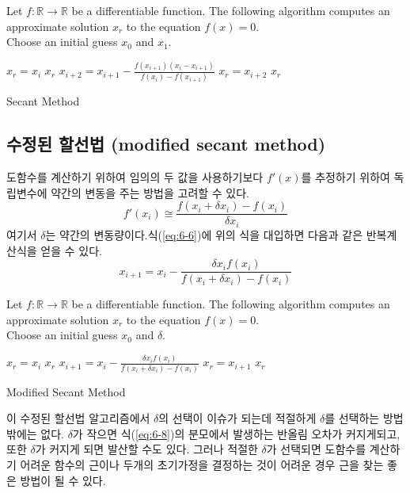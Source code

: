 \begin{algorithm}
Let $f:\mathbb{R}\rightarrow\mathbb{R}$ be a differentiable function. The following algorithm computes an approximate solution $x_{r}$ to the equation $f(x)=0$.\\
Choose an initial guess $x_{0}$ and $x_{1}$.
\begin{algorithmic}
    \State $x_{r}=x_{i}$
    \State \Return $x_{r}$
  \EndIf
  \State $x_{i+2}=x_{i+1}-\frac{f(x_{i+1})(x_{i}-x_{i+1})}{f(x_{i})-f(x_{i+1})}$
    \State $x_{r}=x_{i+2}$
    \State \Return $x_{r}$
  \EndIf
\EndFor
\end{algorithmic}
\caption{Secant Method}
\end{algorithm}

\clearpage
\subsection{수정된 할선법 (modified secant method)}
도함수를 계산하기 위하여 임의의 두 값을 사용하기보다 $f'(x)$를 추정하기 위하여 독립변수에 약간의 변동을 주는 방법을 고려할 수 있다.
\begin{equation}
f'(x_{i})\cong \frac{f(x_{i}+\delta x_{i})-f(x_{i})}{\delta x_{i}}
\end{equation}
여기서 $\delta$는 약간의 변동량이다.식(\ref{eq:6-6})에 위의 식을 대입하면 다음과 같은 반복계산식을 얻을 수 있다.
\begin{equation}\label{eq:6-8}
x_{i+1}=x_{i}-\frac{\delta x_{i}f(x_{i})}{f(x_{i}+\delta x_{i})-f(x_{i})}
\end{equation}

\begin{algorithm}
Let $f:\mathbb{R}\rightarrow\mathbb{R}$ be a differentiable function. The following algorithm computes an approximate solution $x_{r}$ to the equation $f(x)=0$.\\
Choose an initial guess $x_{0}$ and $\delta$.
\begin{algorithmic}
    \State $x_{r}=x_{i}$
    \State \Return $x_{r}$
  \EndIf
  \State $x_{i+1}=x_{i}-\frac{\delta x_{i}f(x_{i})}{f(x_{i}+\delta x_{i})-f(x_{i})}$
    \State $x_{r}=x_{i+1}$
    \State \Return $x_{r}$
  \EndIf
\EndFor
\end{algorithmic}
\caption{Modified Secant Method}
\end{algorithm}
이 수정된 할선법 알고리즘에서 $\delta$의 선택이 이슈가 되는데 적절하게 $\delta$를 선택하는 방법밖에는 없다. $\delta$가 작으면 식(\ref{eq:6-8})의 분모에서 발생하는 반올림 오차가 커지게되고, 또한 $\delta$가 커지게 되면 발산할 수도 있다. 그러나 적절한 $\delta$가 선택되면 도함수를 계산하기 어려운 함수의 근이나 두개의 초기가정을 결정하는 것이 어려운 경우 근을 찾는 좋은 방법이 될 수 있다.